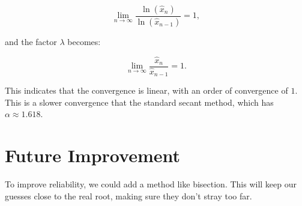 \documentclass[10pt]{article}
\begin{document}
\begin{equation*}
\lim_{n \to \infty} \frac{\ln(\hat{x}_n)}{\ln(\hat{x}_{n-1})} = 1,
\end{equation*}

and the factor $\lambda$ becomes:

\begin{equation*}
\lim_{n \to \infty} \frac{\hat{x}_n}{\hat{x}_{n-1}} = 1.
\end{equation*}

This indicates that the convergence is linear, with an order of convergence of $1$.
This is a slower convergence that the standard secant method, which has \(\alpha \approx 1.618\).

\section*{Future Improvement}
To improve reliability, we could add a method like bisection. This will keep our guesses close to the real root, making sure they don't stray too far.
\end{document}
